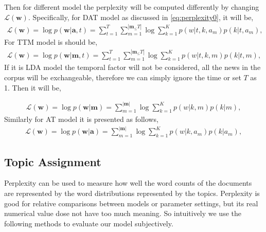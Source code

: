 {Then for different model the perplexity will be computed differently by changing $\mathcal L (\boldsymbol w)$. Specifically, for DAT model as discussed in \ref{eq:perplexity0}, it will be, 
\begin{equation}\label{p1}
\begin{split}
\mathcal L (\boldsymbol w)
    = \log p(\boldsymbol w | \boldsymbol a, t)
    = \sum_{t=1}^{T}\sum_{m=1}^{|\mathbf{m}_\le T|}\log \sum_{k=1}^K p(w | t,k,a_m)p(k | t,a_m),
\end{split}
\end{equation}
For TTM model is should be,
\begin{equation}\label{p2}
\begin{split}
\mathcal L (\boldsymbol w)
    = \log p(\boldsymbol w | \boldsymbol m, t)
    = \sum_{t=1}^{T}\sum_{m=1}^{|\mathbf{m}_\le T|}\log \sum_{k=1}^K p(w | t,k,m)p(k | t,m),
\end{split}
\end{equation}
If it is LDA model the temporal factor will not be considered, all the news in the corpus will be exchangeable, therefore we can simply ignore the time or set $T$ as 1. Then it will be, 

\begin{equation}\label{p2}
\begin{split}
\mathcal L (\boldsymbol w)
    = \log p(\boldsymbol w | \boldsymbol m)
    = \sum_{m=1}^{|\mathbf{m}|}\log \sum_{k=1}^K p(w | k,m)p(k | m),
\end{split}
\end{equation}
Similarly for AT model it is presented as follows,
\begin{equation}\label{p1}
\begin{split}
\mathcal L (\boldsymbol w)
    = \log p(\boldsymbol w | \boldsymbol a)
    = \sum_{m=1}^{|\mathbf{m}|}\log \sum_{k=1}^K p(w | k,a_m)p(k | a_m),
\end{split}
\end{equation}







\subsection{Topic Assignment}\label{sec:topicassignment}

Perplexity can be used to measure how well the word counts of the documents are represented by the word distributions represented by the topics. Perplexity is good for relative comparisons between models or parameter settings, but its real numerical value dose not have too much meaning. So intuitively we use the following methods to evaluate our model subjectively.

}
